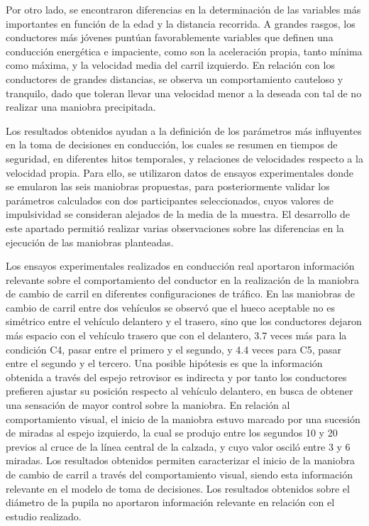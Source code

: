Por otro lado, se encontraron diferencias en la determinación de las variables más importantes en función de la edad y la distancia recorrida. A grandes rasgos, los conductores más jóvenes puntúan favorablemente variables que definen una conducción energética e impaciente, como son la aceleración propia, tanto mínima como máxima, y la velocidad media del carril izquierdo. En relación con los conductores de grandes distancias, se observa un comportamiento cauteloso y tranquilo, dado que toleran llevar una velocidad menor a la deseada con tal de no realizar una maniobra precipitada.  

Los resultados obtenidos ayudan a la definición de los parámetros más influyentes en la toma de decisiones en conducción, los cuales se resumen en tiempos de seguridad, en diferentes hitos temporales, y relaciones de velocidades respecto a la velocidad propia. Para ello, se utilizaron datos de ensayos experimentales donde se emularon las seis maniobras propuestas, para posteriormente validar los parámetros calculados con dos participantes seleccionados, cuyos valores de impulsividad se consideran alejados de la media de la muestra. El desarrollo de este apartado permitió realizar varias observaciones sobre las diferencias en la ejecución de las maniobras planteadas.  

Los ensayos experimentales realizados en conducción real aportaron información relevante sobre el comportamiento del conductor en la realización de la maniobra de cambio de carril en diferentes configuraciones de tráfico. En las maniobras de cambio de carril entre dos vehículos se observó que el hueco aceptable no es simétrico entre el vehículo delantero y el trasero, sino que los conductores dejaron más espacio con el vehículo trasero que con el delantero, 3.7 veces más para la condición C4, pasar entre el primero y el segundo, y 4.4 veces para C5, pasar entre el segundo y el tercero. Una posible hipótesis es que la información obtenida a través del espejo retrovisor es indirecta y por tanto los conductores prefieren ajustar su posición respecto al vehículo delantero, en busca de obtener una sensación de mayor control sobre la maniobra. En relación al comportamiento visual, el inicio de la maniobra estuvo marcado por una sucesión de miradas al espejo izquierdo, la cual se produjo entre los segundos 10 y 20 previos al cruce de la línea central de la calzada, y cuyo valor osciló entre 3 y 6 miradas. Los resultados obtenidos permiten caracterizar el inicio de la maniobra de cambio de carril a través del comportamiento visual, siendo esta información relevante en el modelo de toma de decisiones. Los resultados obtenidos sobre el diámetro de la pupila no aportaron información relevante en relación con el estudio realizado.  

